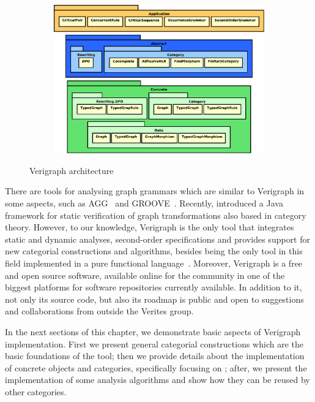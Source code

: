 \begin{figure}[!ht]
  \centering
  \begin{subfigure}[t]{.5\textwidth}
    \centerline{\includegraphics[scale=0.4]{images/verigraph/layers}}
  \end{subfigure}
  \caption{Verigraph architecture}\label{fig:verigraph:layers}
\end{figure}

There are tools for analysing graph grammars which are similar to Verigraph in some aspects, such as AGG~\cite{Taentzer2000} and GROOVE~\cite{Rensink2004}. Recently, \cite{Deckwerth2016} introduced a Java framework for static verification of graph transformations also based in category theory.
  However, to our knowledge, Verigraph is the only tool that integrates static and dynamic analyses, second-order specifications and provides support for new categorial constructions and algorithms, besides being the only tool in this field implemented in a pure functional language~\cite{Costa2016}.
  Moreover, Verigraph is a free and open source software, available online for the community in one of the biggest platforms for software repositories currently available. In addition to it, not only its source code, but also its roadmap is public and open to suggestions and collaborations from outside the Verites group.

In the next sections of this chapter, we demonstrate basic aspects of Verigraph implementation. First we present general categorial constructions which are the basic foundations of the tool; then we provide details about the implementation of concrete objects and categories, specifically focusing on \typedGraphCategory{}; after, we present the implementation of some analysis algorithms and show how they can be reused by other categories. %

